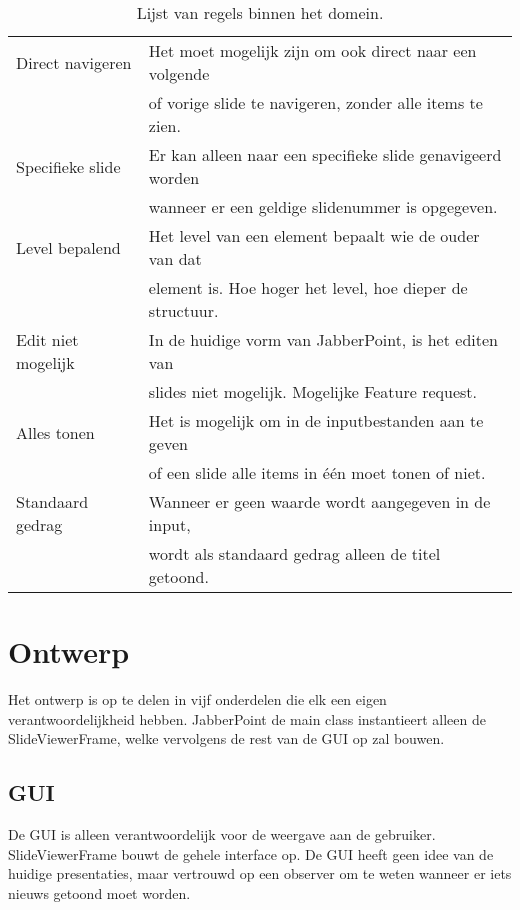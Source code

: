 \documentclass[a4paper]{article}
\newcommand{\1}[0]{\'{e}\'{e}n}
\begin{document}
\begin{table}[!h]
\begin{tabular}{ll}
 	Direct navigeren & Het moet mogelijk zijn om ook direct naar een volgende \\& of vorige slide te navigeren, zonder alle items te zien.\\
 	Specifieke slide & Er kan alleen naar een specifieke slide genavigeerd worden \\& wanneer er een geldige slidenummer is opgegeven.\\
 	Level bepalend & Het level van een element bepaalt wie de ouder van dat \\& element is. Hoe hoger het level, hoe dieper de structuur.\\
 	Edit niet mogelijk & In de huidige vorm van JabberPoint, is het editen van \\& slides niet mogelijk. Mogelijke Feature request.\\
 	Alles tonen & Het is mogelijk om in de inputbestanden aan te geven \\& of een slide alle items in \1 moet tonen of niet.\\
 	Standaard gedrag & Wanneer er geen waarde wordt aangegeven in de input, \\& wordt als standaard gedrag alleen de titel getoond.\\
  	\bottomrule
	\end{tabular}
\caption{Lijst van regels binnen het domein.}
\label{table:regels}
\end{table}

\section{Ontwerp}
\label{sec:ontwerp}
Het ontwerp is op te delen in vijf onderdelen die elk een eigen
verantwoordelijkheid hebben. JabberPoint de main class instantieert alleen de
SlideViewerFrame, welke vervolgens de rest van de GUI op zal bouwen.

\subsection{GUI}
De GUI is alleen verantwoordelijk voor de weergave aan de gebruiker.
SlideViewerFrame bouwt de gehele interface op. De GUI heeft geen idee van de
huidige presentaties, maar vertrouwd op een observer om te weten wanneer er iets
nieuws getoond moet worden.
\end{document}
